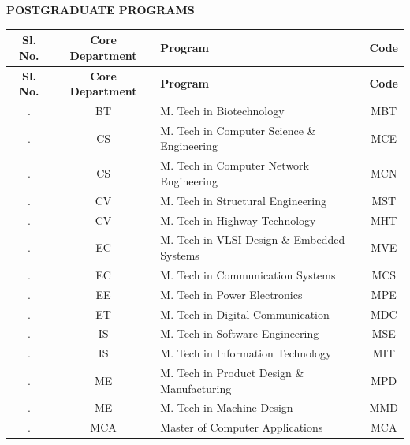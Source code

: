 \clearpage  
\fancyfoot[R]{}
\begin{center}
	{\Large\bfseries POSTGRADUATE PROGRAMS }
\end{center}

\vspace{0.5cm}

\renewcommand{\arraystretch}{1.25}

\setcounter{rowcount}{0}

\begin{longtable}{|c|c|p{9cm}|c|}
	\hline
	\textbf{Sl. No.} & \textbf{Core Department} & \textbf{Program} & \textbf{Code} \\ \hline
	\endfirsthead
	
	\hline
	\textbf{Sl. No.} & \textbf{Core Department} & \textbf{Program} & \textbf{Code} \\ \hline
	\endhead
	
	\stepcounter{rowcount}\therowcount. & BT & M. Tech in Biotechnology & MBT \\ \hline
	\stepcounter{rowcount}\therowcount. & CS & M. Tech in Computer Science \& Engineering & MCE \\ \hline
	\stepcounter{rowcount}\therowcount. & CS & M. Tech in Computer Network Engineering & MCN \\ \hline
	\stepcounter{rowcount}\therowcount. & CV & M. Tech in Structural Engineering & MST \\ \hline
	\stepcounter{rowcount}\therowcount. & CV & M. Tech in Highway Technology & MHT \\ \hline
	\stepcounter{rowcount}\therowcount. & EC & M. Tech in VLSI Design \& Embedded Systems & MVE \\ \hline
	\stepcounter{rowcount}\therowcount. & EC & M. Tech in Communication Systems & MCS \\ \hline
	\stepcounter{rowcount}\therowcount. & EE & M. Tech in Power Electronics & MPE \\ \hline
	\stepcounter{rowcount}\therowcount. & ET & M. Tech in Digital Communication & MDC \\ \hline
	\stepcounter{rowcount}\therowcount. & IS & M. Tech in Software Engineering & MSE \\ \hline
	\stepcounter{rowcount}\therowcount. & IS & M. Tech in Information Technology & MIT \\ \hline
	\stepcounter{rowcount}\therowcount. & ME & M. Tech in Product Design \& Manufacturing & MPD \\ \hline
	\stepcounter{rowcount}\therowcount. & ME & M. Tech in Machine Design & MMD \\ \hline
	\stepcounter{rowcount}\therowcount. & MCA & Master of Computer Applications & MCA \\ \hline
	
\end{longtable} 
\clearpage